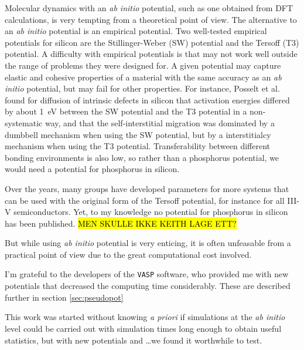 \documentclass[11pt,bibliography=totoc,index=totoc]{scrbook}   %
\newcommand{\comment}[1]{\hl{#1}}
\newcommand{\vasp}{{\texttt{VASP}}} %
\begin{document}

Molecular dynamics with an \textit{ab initio} potential, such as one obtained from DFT calculations, is very tempting from a theoretical point of view. 
The alternative to an \textit{ab initio} potential is an empirical potential. 
Two well-tested empirical potentials for silicon are the Stillinger-Weber (SW) potential\cite{Stillinger:1985} and the Tersoff (T3) potential.\cite{Tersoff} 
A difficulty with empirical potentials is that may not work well outside the range of problems they were designed for.
A given potential may capture elastic and cohesive properties of a material with the same accuracy as an \textit{ab initio} potential, but may fail for other properties.\cite{Powell:2007}
For instance, Posselt et al. found for diffusion of intrinsic defects in silicon that activation energies differed by about 1~eV between the SW potential and the T3 potential in a non-systematic way, and that the self-interstitial migration was dominated by a dumbbell mechanism when using the SW potential, but by a interstitialcy mechanism when using the T3 potential.\cite{Posselt:2008}
Transferability between different bonding environments is also low, so rather than a phosphorus potential, we would need a potential for phosphorus in silicon.

Over the years, many groups have developed parameters for more systems that can be used with the original form of the Tersoff potential, for instance for all III-V semiconductors.\cite{Powell:2007}
Yet, to my knowledge no potential for phosphorus in silicon has been published.
\comment{MEN SKULLE IKKE KEITH LAGE ETT?}


But while using \textit{ab initio} potential is very enticing, it is often unfeasable from a practical point of view due to the great computational cost involved.

I'm grateful to the developers of the {\vasp} software, who provided me with new potentials that decreased the computing time considerably. These are described further in section \ref{sec:pseudopot}

This work was started without knowing \textit{a priori} if simulations at the \textit{ab initio} level could be carried out with simulation times long enough to obtain useful statistics, but with new potentials and \ldots we found it worthwhile to test.
\end{document}
